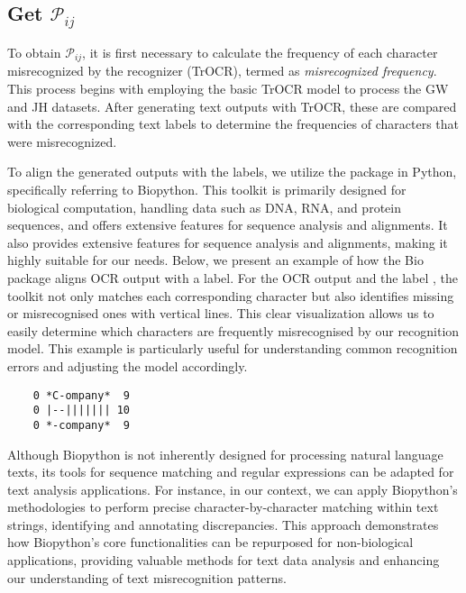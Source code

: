 \subsection{Get $\mathcal{P}_{ij}$}
\label{subsec:3_get_pij}
To obtain $\mathcal{P}_{ij}$, it is first necessary to calculate the frequency of each character misrecognized by the recognizer (TrOCR), termed as \emph{misrecognized frequency}. This process begins with employing the basic TrOCR model to process the GW and JH datasets. After generating text outputs with TrOCR, these are compared with the corresponding text labels to determine the frequencies of characters that were misrecognized.

To align the generated outputs with the labels, we utilize the  package in Python, specifically referring to Biopython. This toolkit is primarily designed for biological computation, handling data such as DNA, RNA, and protein sequences, and offers extensive features for sequence analysis and alignments. It also provides extensive features for sequence analysis and alignments, making it highly suitable for our needs. Below, we present an example of how the Bio package aligns OCR output with a label. For the OCR output  and the label , the toolkit not only matches each corresponding character but also identifies missing or misrecognised ones with vertical lines. This clear visualization allows us to easily determine which characters are frequently misrecognised by our recognition model. This example is particularly useful for understanding common recognition errors and adjusting the model accordingly.

\begin{center}
    \begin{minipage}{0.3\textwidth} 
    \begin{verbatim}
    0 *C-ompany*  9
    0 |--||||||| 10
    0 *-company*  9
    \end{verbatim}
    \end{minipage}
\end{center}


Although Biopython is not inherently designed for processing natural language texts, its tools for sequence matching and regular expressions can be adapted for text analysis applications. For instance, in our context, we can apply Biopython's methodologies to perform precise character-by-character matching within text strings, identifying and annotating discrepancies. This approach demonstrates how Biopython's core functionalities can be repurposed for non-biological applications, providing valuable methods for text data analysis and enhancing our understanding of text misrecognition patterns.

